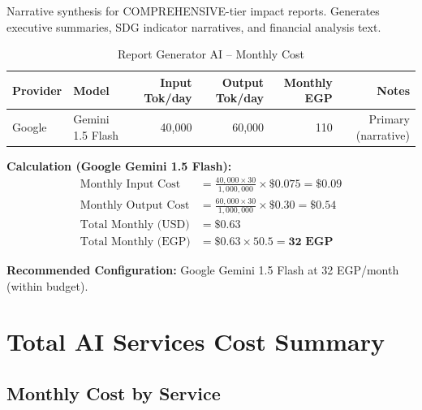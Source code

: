 \documentclass[11pt,a4paper]{article}
\begin{document}
Narrative synthesis for COMPREHENSIVE-tier impact reports. Generates executive summaries, SDG indicator narratives, and financial analysis text.

\begin{table}[H]
\centering
\begin{tabular}{|l|l|r|r|r|r|}
\hline
\textbf{Provider} & \textbf{Model} & \textbf{Input Tok/day} & \textbf{Output Tok/day} & \textbf{Monthly EGP} & \textbf{Notes} \\
\hline
Google & Gemini 1.5 Flash & 40,000 & 60,000 & 110 & Primary (narrative) \\
\hline
\end{tabular}
\caption{Report Generator AI -- Monthly Cost}
\end{table}

\noindent\textbf{Calculation (Google Gemini 1.5 Flash):}
\begin{align*}
\text{Monthly Input Cost} &= \frac{40{,}000 \times 30}{1{,}000{,}000} \times \$0.075 = \$0.09 \\
\text{Monthly Output Cost} &= \frac{60{,}000 \times 30}{1{,}000{,}000} \times \$0.30 = \$0.54 \\
\text{Total Monthly (USD)} &= \$0.63 \\
\text{Total Monthly (EGP)} &= \$0.63 \times 50.5 = \textbf{32 EGP}
\end{align*}

\textbf{Recommended Configuration:} Google Gemini 1.5 Flash at 32 EGP/month (within budget).

\newpage

\section{Total AI Services Cost Summary}

\subsection{Monthly Cost by Service}
\end{document}
